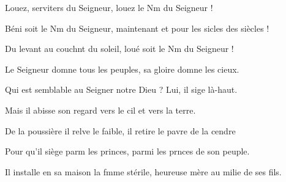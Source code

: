 \item Louez, serviters du Seigneur,\psstar{} louez le Nm du Seigneur !
\item Béni soit le Nm du Seigneur,\psstar{} maintenant et pour les sicles des siècles !
\item Du levant au couchnt du soleil,\psstar{} loué soit le Nm du Seigneur !
\item Le Seigneur domne tous les peuples,\psstar{} sa gloire domne les cieux.
\item Qui est semblable au Seigner notre Dieu ?\psstar{} Lui, il sige là-haut.
\item Mais il abisse son regard\psstar{} vers le cil et vers la terre.
\item De la poussière il relve le faible,\psstar{} il retire le pavre de la cendre
\item Pour qu’il siège parm les princes,\psstar{} parmi les prnces de son peuple.
\item Il installe en sa maison la fmme stérile,\psstar{} heureuse mère au milie de ses fils.